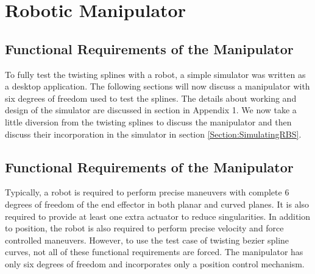 \section{Robotic Manipulator}
\label{Chapter:RoboticManipulator}
{
    \subsection{Functional Requirements of the Manipulator}
    {
        To fully test the twisting splines with a robot, a simple simulator was written as a desktop application. The following sections will now discuss a manipulator with six degrees of freedom used to test the splines. The details about working and design of the simulator are discussed in section \label{Chapter:Drogon} in Appendix 1. We now take a little diversion from the twisting splines to discuss the manipulator and then discuss their incorporation in the simulator in section \ref{Section:SimulatingRBS}.
    }
    \subsection{Functional Requirements of the Manipulator}
    {
        Typically, a robot is required to perform precise maneuvers with complete $6$ degrees of freedom of the end effector in both planar and curved planes. It is also required to provide at least one extra actuator to reduce singularities. In addition to position, the robot is also required to perform precise velocity and force controlled maneuvers. However, to use the test case of twisting bezier spline curves, not all of these functional requirements are forced. The manipulator has only six degrees of freedom and incorporates only a position control mechanism.
    }
}
